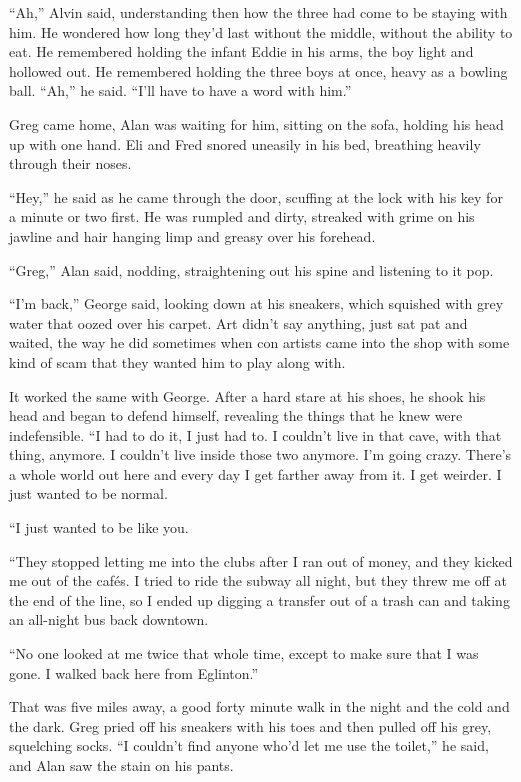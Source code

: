 ``Ah,'' Alvin said, understanding then how the three had come to be
staying with him.  He wondered how long they'd last without the
middle, without the ability to eat.  He remembered holding the infant
Eddie in his arms, the boy light and hollowed out.  He remembered
holding the three boys at once, heavy as a bowling ball.  ``Ah,'' he
said.  ``I'll have to have a word with him.''

 Greg came home, Alan was waiting for him, sitting on the sofa,
holding his head up with one hand.  Eli and Fred snored uneasily in
his bed, breathing heavily through their noses.

``Hey,'' he said as he came through the door, scuffing at the lock
with his key for a minute or two first.  He was rumpled and dirty,
streaked with grime on his jawline and hair hanging limp and greasy
over his forehead.

``Greg,'' Alan said, nodding, straightening out his spine and
listening to it pop.

``I'm back,'' George said, looking down at his sneakers, which
squished with grey water that oozed over his carpet.  Art didn't say
anything, just sat pat and waited, the way he did sometimes when con
artists came into the shop with some kind of scam that they wanted him
to play along with.

It worked the same with George.  After a hard stare at his shoes, he
shook his head and began to defend himself, revealing the things that
he knew were indefensible.  ``I had to do it, I just had to.  I
couldn't live in that cave, with that thing, anymore.  I couldn't live
inside those two anymore.  I'm going crazy.  There's a whole world out
here and every day I get farther away from it.  I get weirder.  I just
wanted to be normal.

``I just wanted to be like you.

``They stopped letting me into the clubs after I ran out of money, and
they kicked me out of the caf\'{e}s.  I tried to ride the subway all
night, but they threw me off at the end of the line, so I ended up
digging a transfer out of a trash can and taking an all-night bus back
downtown.

``No one looked at me twice that whole time, except to make sure that
I was gone.  I walked back here from Eglinton.''

That was five miles away, a good forty minute walk in the night and
the cold and the dark.  Greg pried off his sneakers with his toes and
then pulled off his grey, squelching socks.  ``I couldn't find anyone
who'd let me use the toilet,'' he said, and Alan saw the stain on his
pants.

